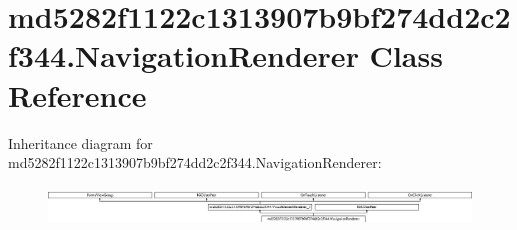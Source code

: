 \hypertarget{classmd5282f1122c1313907b9bf274dd2c2f344_1_1NavigationRenderer}{}\section{md5282f1122c1313907b9bf274dd2c2f344.\+Navigation\+Renderer Class Reference}
\label{classmd5282f1122c1313907b9bf274dd2c2f344_1_1NavigationRenderer}
Inheritance diagram for md5282f1122c1313907b9bf274dd2c2f344.\+Navigation\+Renderer\+:\begin{figure}[H]
\begin{center}
\leavevmode
\includegraphics[height=1.029412cm]{classmd5282f1122c1313907b9bf274dd2c2f344_1_1NavigationRenderer}
\end{center}
\end{figure}
